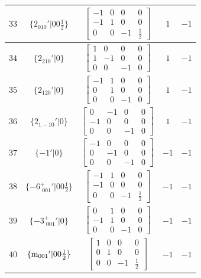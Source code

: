 \documentclass[fleqn,8pt]{jsarticle}
\begin{document}
\begin{longtable}{ccccc}
$ 33 $ & $ \{2{}_{010}{}'|0 0 \frac{1}{2}\} $ & $ \begin{bmatrix} -1 & 0 & 0 & 0 \\ -1 & 1 & 0 & 0 \\ 0 & 0 & -1 & \frac{1}{2} \end{bmatrix} $ & $ 1 $ & $ -1 $ \\ \hline
$ 34 $ & $ \{2{}_{210}{}'|0\} $ & $ \begin{bmatrix} 1 & 0 & 0 & 0 \\ 1 & -1 & 0 & 0 \\ 0 & 0 & -1 & 0 \end{bmatrix} $ & $ 1 $ & $ -1 $ \\ \hline
$ 35 $ & $ \{2{}_{120}{}'|0\} $ & $ \begin{bmatrix} -1 & 1 & 0 & 0 \\ 0 & 1 & 0 & 0 \\ 0 & 0 & -1 & 0 \end{bmatrix} $ & $ 1 $ & $ -1 $ \\ \hline
$ 36 $ & $ \{2{}_{1-10}{}'|0\} $ & $ \begin{bmatrix} 0 & -1 & 0 & 0 \\ -1 & 0 & 0 & 0 \\ 0 & 0 & -1 & 0 \end{bmatrix} $ & $ 1 $ & $ -1 $ \\ \hline
$ 37 $ & $ \{-1{}'|0\} $ & $ \begin{bmatrix} -1 & 0 & 0 & 0 \\ 0 & -1 & 0 & 0 \\ 0 & 0 & -1 & 0 \end{bmatrix} $ & $ -1 $ & $ -1 $ \\ \hline
$ 38 $ & $ \{-6^{+}_{\,\,001}{}'|0 0 \frac{1}{2}\} $ & $ \begin{bmatrix} -1 & 1 & 0 & 0 \\ -1 & 0 & 0 & 0 \\ 0 & 0 & -1 & \frac{1}{2} \end{bmatrix} $ & $ -1 $ & $ -1 $ \\ \hline
$ 39 $ & $ \{-3^{+}_{\,\,001}{}'|0\} $ & $ \begin{bmatrix} 0 & 1 & 0 & 0 \\ -1 & 1 & 0 & 0 \\ 0 & 0 & -1 & 0 \end{bmatrix} $ & $ -1 $ & $ -1 $ \\ \hline
$ 40 $ & $ \{{\rm m}_{001}{}'|0 0 \frac{1}{2}\} $ & $ \begin{bmatrix} 1 & 0 & 0 & 0 \\ 0 & 1 & 0 & 0 \\ 0 & 0 & -1 & \frac{1}{2} \end{bmatrix} $ & $ -1 $ & $ -1 $ \\ \hline

\end{longtable}
\end{document}
